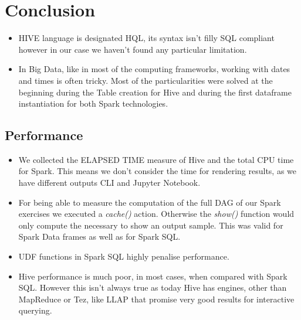 \documentclass[conference,compsoc]{IEEEtran}
\begin{document}
\section{Conclusion}


\begin{itemize}
\item HIVE language is designated HQL, its syntax isn't filly SQL compliant however in our case we haven't found any particular limitation.
\item In Big Data, like in most of the computing frameworks, working with dates and times is often tricky. Most of the particularities were solved at the beginning during the Table creation for Hive and during the first dataframe instantiation for both Spark technologies.

\end{itemize}

\subsection{Performance}
\begin{itemize}
\item We collected the ELAPSED TIME measure of Hive and the total CPU time for Spark. This means we don't consider the time for rendering results, as we have different outputs CLI and Jupyter Notebook.
\item For being able to measure the computation of the full DAG of our Spark exercises we executed a \textit{cache()} action. Otherwise the \textit{show()} function would only compute the necessary to show an output sample. This was valid for Spark Data frames as well as for Spark SQL.
\item UDF functions in Spark SQL highly penalise performance.
\item Hive performance is much poor, in most cases, when compared with Spark SQL. However this isn't always true as today Hive has engines, other than MapReduce or Tez, like LLAP that promise very good results for interactive querying.
\end{itemize}





\end{document}
